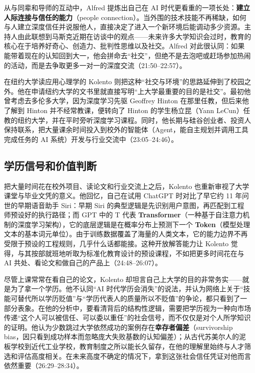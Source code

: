 \documentclass[UTF8,a4paper,11pt,fontset=fandol]{ctexart}
\begin{document}
从与同辈和导师的互动中，Alfred 提炼出自己在 AI 时代更看重的一项长处：\textbf{建立人际连接与信任的能力}（people connection）。当外围的技术技能不再稀缺，如何与人建立深度信任并说服他人，直接决定了进入一个新环境后能调动多少资源。主持人由此联想到马斯克近期在访谈中的观点——未来许多大学知识会过时，教育的核心在于培养好奇心、创造力、批判性思维以及社交。Alfred 对此很认同：如果能带着现在的认知回到大一，他会拼命去“社交”，但绝不是去泡吧或赶场参加热闹的活动，而是去争取更多一对一的深度交流（21:50–22:57）。

在纽约大学读应用心理学的 Kolento 则把这种“社交与环境”的思路延伸到了校园之外。他在申请纽约大学的文书里就直接写明“上大学最重要的目的是社交”。最初他曾考虑去多伦多大学，因为深度学习先驱 Geoffrey Hinton 在那里任教，但后来他了解到 Hinton 并不经常教课，便转向了 Hinton 的学生杨立昆（Yann LeCun）任教的纽约大学，并在平时旁听深度学习课程。同时，他长期与硅谷创业者、投资人保持联系，把大量课余时间投入到校外的智能体（Agent，能自主规划并调用工具完成任务的 AI 系统）开发与行业交流中（23:05–24:46）。

\subsection{学历信号和价值判断}
把大量时间花在校外项目、读论文和行业交流上之后，Kolento 也重新审视了大学课堂与毕业文凭的意义。他回忆，自己在试用 ChatGPT 时对比了早它约 11 年问世的早期语音助手 Siri：早期 Siri 的典型逻辑是先识别用户意图，再匹配到工程师预设好的执行路径；而 GPT 中的 T 代表 \textbf{Transformer}（一种基于自注意力机制的深度学习架构），它的底层逻辑是在概率分布上预测下一个 \textbf{Token}（模型处理文本的基本词元单位）。由于训练数据覆盖了海量的人类文本，它的能力边界不再受限于预设的工程规则，几乎什么话都能接。这种开放解答能力让 Kolento 觉得，与其按部就班地听取为标准化教育设计的预设课程，不如把更多时间花在与 AI 共处、看论文和做自己的产品上（24:48–26:07）。

尽管上课常常在看自己的论文，Kolento 却坦言自己上大学的目的非常务实——就是为了拿一个学历。他不认同“AI 时代学历会消失”的说法，并认为网络上关于“技能可替代所以学历贬值”与“学历代表人的质量所以不贬值”的争论，都只看到了一部分表象。在他的分析中，要看清背后的结构性逻辑，需要把学历视为一种向市场传递“这个人可以被信任、可以委以重任”的社会信号，而不仅仅是对个人所学知识的证明。他认为少数跳过大学依然成功的案例存在\textbf{幸存者偏差}（survivorship bias，因只看到成功样本而忽略庞大失败基数的认知偏差）；从古代苏美尔人的泥板学校到近代工业学校，教育制度之所以能长久留存，在他的理解里始终与人才筛选和评估高度相关。在未来高度不确定的情况下，拿到这张社会信任凭证对他而言依然重要（26:29–28:34）。
\end{document}

